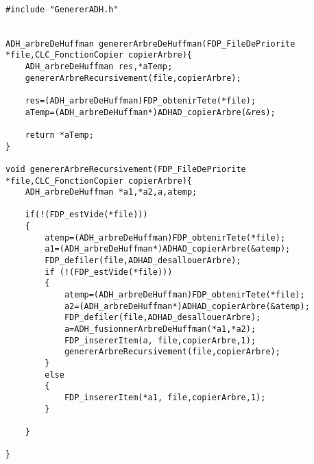 \begin{verbatim}

#include "GenererADH.h"


ADH_arbreDeHuffman genererArbreDeHuffman(FDP_FileDePriorite *file,CLC_FonctionCopier copierArbre){
	ADH_arbreDeHuffman res,*aTemp;
    genererArbreRecursivement(file,copierArbre);
   
    res=(ADH_arbreDeHuffman)FDP_obtenirTete(*file);
    aTemp=(ADH_arbreDeHuffman*)ADHAD_copierArbre(&res);
    
    return *aTemp;
}

void genererArbreRecursivement(FDP_FileDePriorite *file,CLC_FonctionCopier copierArbre){
	ADH_arbreDeHuffman *a1,*a2,a,atemp;
	
    if(!(FDP_estVide(*file)))
    {
		atemp=(ADH_arbreDeHuffman)FDP_obtenirTete(*file);
		a1=(ADH_arbreDeHuffman*)ADHAD_copierArbre(&atemp);
		FDP_defiler(file,ADHAD_desallouerArbre);
		if (!(FDP_estVide(*file)))
		{
			atemp=(ADH_arbreDeHuffman)FDP_obtenirTete(*file);
			a2=(ADH_arbreDeHuffman*)ADHAD_copierArbre(&atemp);
			FDP_defiler(file,ADHAD_desallouerArbre);
			a=ADH_fusionnerArbreDeHuffman(*a1,*a2);
			FDP_insererItem(a, file,copierArbre,1);
			genererArbreRecursivement(file,copierArbre);
		}
		else 
		{
			FDP_insererItem(*a1, file,copierArbre,1);
		}
        
    }

}

\end{verbatim}
 
